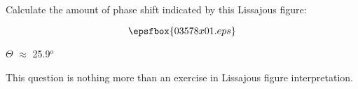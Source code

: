 

Calculate the amount of phase shift indicated by this Lissajous figure:

$$\epsfbox{03578x01.eps}$$







$\Theta$ $\approx$ 25.9$^{o}$







This question is nothing more than an exercise in Lissajous figure interpretation.




